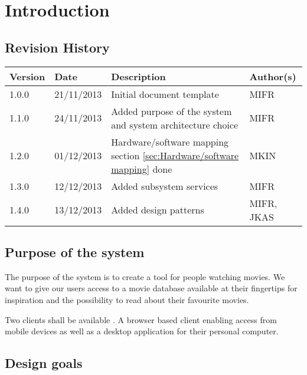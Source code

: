 \chapter{Introduction}
\label{sec:introduction}

\section{Revision History}
\begin{center}
    \begin{tabular}{ | l | l | p{6cm} | p{4cm} |}
    \hline
    Version & Date & Description & Author(s) 
    \\ \hline
    1.0.0 & 21/11/2013 & Initial document template & MIFR
    \\ \hline
    1.1.0 & 24/11/2013 & Added purpose of the system and system architecture choice & MIFR
    \\ \hline
    1.2.0 & 01/12/2013 & Hardware/software mapping section \ref{sec:Hardware/software mapping} done & MKIN
    \\ \hline
    1.3.0 & 12/12/2013 & Added subsystem services & MIFR
    \\ \hline
    1.4.0 & 13/12/2013 & Added design patterns & MIFR, JKAS
    \\ \hline
    \end{tabular}
\end{center}

\section{Purpose of the system}
The purpose of the system is to create a tool for people watching movies. We want to give our users access to a movie database available at their fingertips for inspiration and the possibility to read about their favourite movies.

Two clients shall be available . A browser based client enabling access from mobile devices as well as a desktop application for their personal computer.  




\section{Design goals}

